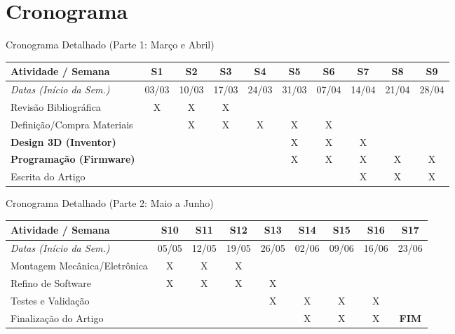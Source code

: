\documentclass[aspectratio=169, xcolor={table}]{beamer}
\begin{document}
\section{Cronograma}

\begin{frame}{Cronograma Detalhado (Parte 1: Março e Abril)}
    \centering
    \scriptsize
    \begin{tabular}{|l|c|c|c|c|c|c|c|c|c|}
    \hline
    \textbf{Atividade / Semana} & \textbf{S1} & \textbf{S2} & \textbf{S3} & \textbf{S4} & \textbf{S5} & \textbf{S6} & \textbf{S7} & \textbf{S8} & \textbf{S9} \\ \hline
    \textit{Datas (Início da Sem.)} & \tiny 03/03 & \tiny 10/03 & \tiny 17/03 & \tiny 24/03 & \tiny 31/03 & \tiny 07/04 & \tiny 14/04 & \tiny 21/04 & \tiny 28/04 \\ \hline
    Revisão Bibliográfica & X & X & X & & & & & & \\ \hline
    Definição/Compra Materiais & & X & X & X & X & X & & & \\ \hline
    \textbf{Design 3D (Inventor)} & & & & & \cellcolor{blue!20}X & \cellcolor{blue!20}X & \cellcolor{blue!20}X & & \\ \hline
    \textbf{Programação (Firmware)} & & & & & \cellcolor{blue!20}X & \cellcolor{blue!20}X & \cellcolor{blue!20}X & \cellcolor{blue!20}X & \cellcolor{blue!20}X \\ \hline
    Escrita do Artigo & & & & & & & \cellcolor{yellow!20}X & \cellcolor{yellow!20}X & \cellcolor{yellow!20}X \\ \hline
    \end{tabular}
\end{frame}

\begin{frame}{Cronograma Detalhado (Parte 2: Maio a Junho)}
    \centering
    \scriptsize
    \begin{tabular}{|l|c|c|c|c|c|c|c|c|}
    \hline
    \textbf{Atividade / Semana} & \textbf{S10} & \textbf{S11} & \textbf{S12} & \textbf{S13} & \textbf{S14} & \textbf{S15} & \textbf{S16} & \textbf{S17} \\ \hline
    \textit{Datas (Início da Sem.)} & \tiny 05/05 & \tiny 12/05 & \tiny 19/05 & \tiny 26/05 & \tiny 02/06 & \tiny 09/06 & \tiny 16/06 & \tiny 23/06 \\ \hline
    Montagem Mecânica/Eletrônica & X & X & X & & & & & \\ \hline
    Refino de Software & X & X & X & X & & & & \\ \hline
    Testes e Validação & & & & X & X & X & X & \\ \hline
    Finalização do Artigo & & & & & X & X & X & \cellcolor{red!20}\textbf{FIM} \\ \hline
    \end{tabular}
\end{frame}
\end{document}
